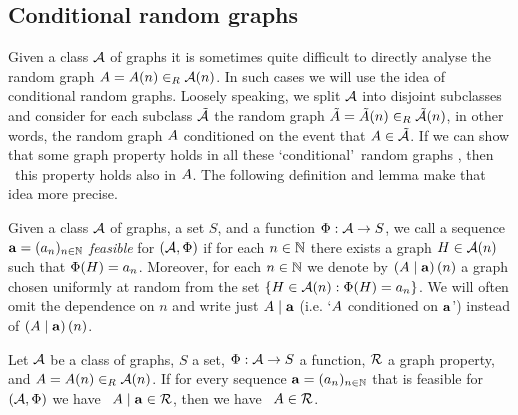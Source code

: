 \subsection{Conditional random graphs}\label{MDsub:conditional_random_graphs}
Given a class $\mathcal{A}$ of graphs it is sometimes quite difficult to directly analyse the random graph $A=A(n)\in_R\mathcal{A}(n)$. In such cases we will use the idea of conditional random graphs. Loosely speaking, we split $\mathcal{A}$ into disjoint subclasses and consider for each subclass $\tilde{\mathcal{A}}$ the random graph $\tilde{A}=\tilde{A}(n)\in_R \tilde{\mathcal{A}}(n)$, in other words, the random graph $A$ conditioned on the event that $A\in \tilde{\mathcal{A}}$. If we can show that some graph property holds in all these \lq conditional\rq\ random graphs \whp, then \whp\ this property holds also in $A$. The following definition and lemma make that idea more precise.
\begin{definition}\label{MDdef:feasible}
	Given a class $\mathcal{A}$ of graphs, a set $S$, and a function $\Phi:\mathcal{A}\to S$, we call a sequence $\mathbf{a}=(a_n)_{n\in \mathbb{N}}$ {\em feasible} for $\left(\mathcal{A}, \Phi\right)$ if for each $n \in \mathbb{N}$ there exists a graph $H \in \mathcal{A}(n)$ such that $\Phi(H)=a_n$. Moreover, for each $n\in \mathbb{N}$ we denote by $\left(A \mid \mathbf{a}\right)(n)$ a graph chosen uniformly at random from the set $\left\{H \in \mathcal{A}(n): \Phi(H)=a_n\right\}$. We will often omit the dependence on $n$ and write just $A \mid \mathbf{a}$ (i.e. \lq $A$ conditioned on $\mathbf{a}$\rq) instead of $\left(A \mid \mathbf{a}\right)(n)$.
\end{definition}
\begin{lem}\label{MDlem:conditional_random_graphs}
	Let $\mathcal{A}$ be a class of graphs, $S$ a set, $\Phi:\mathcal{A}\to S$ a function, $\mathcal{R}$ a graph property, and $A=A(n)\in_R \mathcal{A}(n)$. If for every sequence $\mathbf{a}=(a_n)_{n\in \mathbb{N}}$ that is feasible for $\left(\mathcal{A}, \Phi\right)$ we have \whp\ $A \mid \mathbf{a} \in \mathcal{R}$, then we have \whp\ $A \in \mathcal{R}$.
\end{lem}

